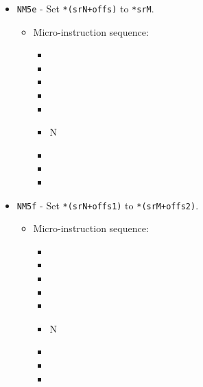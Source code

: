 \documentclass{article}
\begin{document}
\begin{itemize}
    \item \Verb|NM5e| - Set \Verb|*(srN+offs)| to \Verb|*srM|.
    \begin{itemize}
        \item Micro-instruction sequence:
        \begin{itemize}
            \item \pkptroutinc
            \item \datatooffs
            \item \incrementpk
            \item \pkptroutinc
            \item \holddata
            \item \specialtoaddr N
            \item \writeRAMo
            \item \incrementpk
            \item \done
        \end{itemize}
    \end{itemize}
    
    \item \Verb|NM5f| - Set \Verb|*(srN+offs1)| to \Verb|*(srM+offs2)|.
    \begin{itemize}
        \item Micro-instruction sequence:
        \begin{itemize}
            \item \pkptroutinc
            \item \datatooffs
            \item \incrementpk
            \item \pkptroutinc
            \item \holddata
            \item \specialtoaddr N
            \item \writeRAMo
            \item \incrementpk
            \item \done
        \end{itemize}
    \end{itemize}
\end{itemize}
\end{document}
